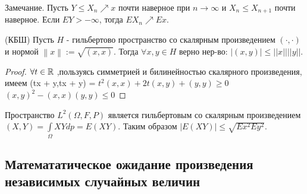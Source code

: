	Замечание. Пусть $Y \le X_n \nearrow x$ почти наверное при $n \to \infty$ и $X_n \le X_{n+1}$ почти наверное. Если  $EY > -\infty$, тогда $ EX_n \nearrow Ex$.
	
		\begin{lemma}\label{lect8:lemma4}
			(КБШ) Пусть $H$ - гильбертово пространство со скалярным произведением $(\cdot,\cdot)$ и нормой $\left\|x\right\|:=\sqrt{(x,x)}$.
			Тогда $\forall x,y \in H$ верно нер-во:
			$|(x, y)| \le ||x||||y||$.	
		\end{lemma}
	
		\begin{proof}
			$\forall t \in \mathbb{R}$ ,пользуясь симметрией и билинейностью скалярного произведения, имеем 
			(tx + y,tx + y) = $t^2(x,x) + 2t(x, y) + (y, y) \ge 0$
			$(x,y)^2 - (x,x)(y,y) \le 0$ 	
		\end{proof}	
		
		Пространство  $L^2(\Omega, F, P)$ является гильбертовым со скалярным произведением $(X, Y) = \int\limits_{\Omega}XY dp = E(XY)$.
		Таким образом $|E(XY)| \le \sqrt{Ex^2Ey^2}$.
		
		\subsection{Математатическое ожидание произведения независимых случайных величин}
		
